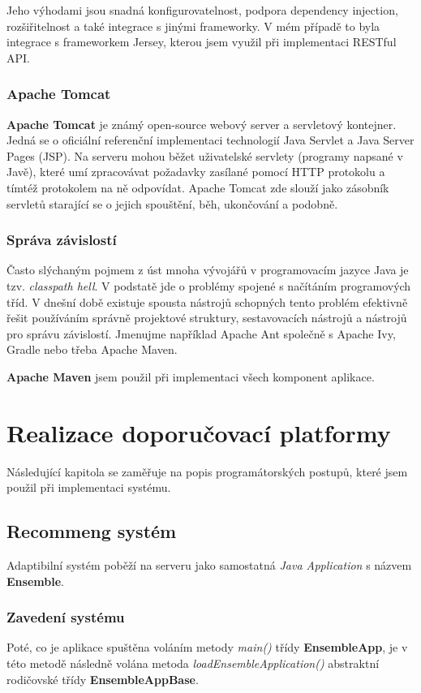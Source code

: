 \documentclass[thesis=M,czech]{FITthesis}[2014/05/07]
\begin{document}
Jeho výhodami jsou snadná konfigurovatelnost, podpora dependency injection, rozšiřitelnost a také integrace s jinými frameworky. V mém případě to byla integrace s frameworkem Jersey, kterou jsem využil při implementaci RESTful API.

\subsubsection{Apache Tomcat}
\textbf{Apache Tomcat} je známý open-source webový server a servletový kontejner. Jedná se o oficiální referenční implementaci technologií Java Servlet a Java Server Pages (JSP). Na serveru mohou běžet uživatelské servlety (programy napsané v Javě), které umí zpracovávat požadavky zasílané pomocí HTTP protokolu a tímtéž protokolem na ně odpovídat. Apache Tomcat zde slouží jako zásobník servletů starající se o jejich spouštění, běh, ukončování a podobně.

\subsubsection{Správa závislostí}
Často slýchaným pojmem z úst mnoha vývojářů v programovacím jazyce Java je tzv. \emph{classpath hell}. V podstatě jde o problémy spojené s načítáním programových tříd. V dnešní době existuje spousta nástrojů schopných tento problém efektivně řešit používáním správně projektové struktury, sestavovacích nástrojů a nástrojů pro správu závislostí. Jmenujme například Apache Ant společně s Apache Ivy, Gradle nebo třeba Apache Maven.

\textbf{Apache Maven} jsem použil při implementaci všech komponent aplikace.

\section{Realizace doporučovací platformy}
\label{chap:impl}

Následující kapitola se zaměřuje na popis programátorských postupů, které jsem použil při implementaci systému.

\subsection{Recommeng systém}
\label{sec:impl}

Adaptibilní systém poběží na serveru jako samostatná \emph{Java Application} s názvem \textbf{Ensemble}.

\subsubsection{Zavedení systému}
Poté, co je aplikace spuštěna voláním metody \emph{main()} třídy \textbf{EnsembleApp}, je v této metodě následně volána metoda \emph{loadEnsembleApplication()} abstraktní rodičovské třídy \textbf{EnsembleAppBase}.
\end{document}
